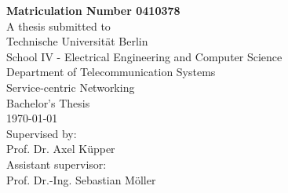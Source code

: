 \begin{titlepage}
\begin{center}
		\textbf{Matriculation Number 0410378}\\
		\vspace{2cm}
	 	A thesis submitted to\\
	 	\vspace{0.5cm}
		Technische Universität Berlin\\
		School IV - Electrical Engineering and Computer Science\\
		Department of Telecommunication Systems\\
		Service-centric Networking\\
		\vspace{0.5cm}
		Bachelor's Thesis\\
		\vspace{2.2cm}
		\today\\
		\vspace{2.0cm}
		\large
		Supervised by:\\
		Prof. Dr. Axel Küpper\\
		\vspace{1cm}
		Assistant supervisor:\\
		Prof. Dr.-Ing. Sebastian Möller
		\end{center}
\end{titlepage}

\shipout\null
\shipout\null
